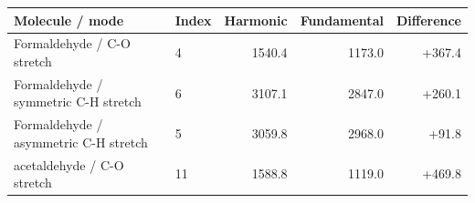 \begin{tabular}{llrrr}\toprule
Molecule / mode & Index & Harmonic & Fundamental & Difference\\\midrule
Formaldehyde / C-O stretch & 4 & 1540.4 & 1173.0 & +367.4\\
Formaldehyde / symmetric C-H stretch & 6 & 3107.1 & 2847.0 & +260.1\\
Formaldehyde / asymmetric C-H stretch & 5 & 3059.8 & 2968.0 & +91.8\\
acetaldehyde / C-O stretch & 11 & 1588.8 & 1119.0 & +469.8\\
\bottomrule\end{tabular}
